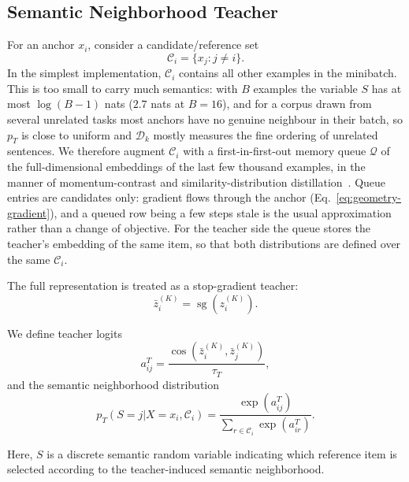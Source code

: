 \documentclass[11pt]{article}
\newcommand{\cD}{\mathcal{D}}
\newcommand{\sg}{\operatorname{sg}}
\newcommand{\simcos}{\operatorname{cos}}
\begin{document}
\subsection{Semantic Neighborhood Teacher}

For an anchor $x_i$, consider a candidate/reference set
\begin{equation}
    \mathcal{C}_i=\{x_j:j\neq i\}.
\end{equation}
In the simplest implementation, $\mathcal{C}_i$ contains all other examples in the minibatch.
This is too small to carry much semantics: with $B$ examples the variable $S$ has at most $\log(B-1)$ nats ($2.7$ nats at $B=16$), and for a corpus drawn from several unrelated tasks most anchors have no genuine neighbour in their batch, so $p_T$ is close to uniform and $\cD_k$ mostly measures the fine ordering of unrelated sentences.
We therefore augment $\mathcal C_i$ with a first-in-first-out memory queue $\mathcal Q$ of the full-dimensional embeddings of the last few thousand examples, in the manner of momentum-contrast and similarity-distribution distillation~\cite{koohpayegani2020compress,fang2021seed}.
Queue entries are candidates only: gradient flows through the anchor (Eq.~\eqref{eq:geometry-gradient}), and a queued row being a few steps stale is the usual approximation rather than a change of objective.
For the teacher side the queue stores the teacher's embedding of the same item, so that both distributions are defined over the same $\mathcal C_i$.

The full representation is treated as a stop-gradient teacher:
\begin{equation}
    \bar z_i^{(K)} = \sg(z_i^{(K)}).
\end{equation}

We define teacher logits
\begin{equation}
    a_{ij}^{T}
    =
    \frac{
        \simcos(
            \bar z_i^{(K)},
            \bar z_j^{(K)}
        )
    }{\tau_T},
\end{equation}
and the semantic neighborhood distribution
\begin{equation}
\boxed{
    p_T(S=j|X=x_i,\mathcal C_i)
    =
    \frac{\exp(a_{ij}^{T})}
    {
        \sum_{r\in\mathcal C_i}
        \exp(a_{ir}^{T})
    }.
}
\label{eq:teacher}
\end{equation}

Here, $S$ is a discrete semantic random variable indicating which reference item is selected according to the teacher-induced semantic neighborhood.
\end{document}
